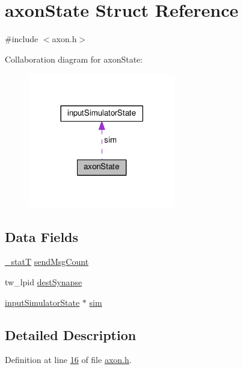 \hypertarget{structaxon_state}{}\section{axon\+State Struct Reference}
\label{structaxon_state}


{\ttfamily \#include $<$axon.\+h$>$}



Collaboration diagram for axon\+State\+:\nopagebreak
\begin{figure}[H]
\begin{center}
\leavevmode
\includegraphics[width=182pt]{structaxon_state__coll__graph}
\end{center}
\end{figure}
\subsection*{Data Fields}
\begin{DoxyCompactItemize}
\item 
\hyperlink{assist_8h_ad77e6fc5a9b03d46e7c97b7c4b92e89f}{\+\_\+stat\+T} \hyperlink{structaxon_state_a217ba44fb923dc4dc62bb73b14e61517}{send\+Msg\+Count}
\item 
tw\+\_\+lpid \hyperlink{structaxon_state_a665999819b255f36d756f17b85bc9a03}{dest\+Synapse}
\item 
\hyperlink{structinput_simulator_state}{input\+Simulator\+State} $\ast$ \hyperlink{structaxon_state_ad1d67487729ff78dd3f00885184b1ef3}{sim}
\end{DoxyCompactItemize}


\subsection{Detailed Description}


Definition at line \hyperlink{axon_8h_source_l00016}{16} of file \hyperlink{axon_8h_source}{axon.\+h}.




